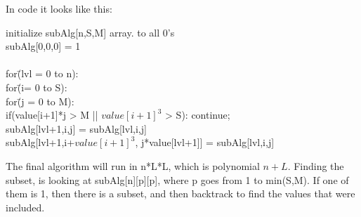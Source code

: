 \documentclass{article}
\begin{document}
\begin{enumerate}
In code it looks like this:
\begin{tabbing}

initialize subAlg[n,S,M] array. to all 0's\\
subAlg[0,0,0] = 1\\
\\
for\=(lvl = 0 to n):\\
\>for\=(i= 0 to S):\\
\>\>for\=(j = 0 to M):\\
\>\>\>if(value[i+1]*j > M || $value[i+1]^3$ > S): continue;\\
\>\>\>subAlg[lvl+1,i,j] = subAlg[lvl,i,j]\\
\>\>\>subAlg[lvl+1,i+$value[i+1]^3$, j*value[lvl+1]] = subAlg[lvl,i,j]\\
\end{tabbing}

The final algorithm will run in n*L*L, which is polynomial $n+L$. Finding the subset, is looking at subAlg[n][p][p], where p goes from 1 to min(S,M). If one of them is 1, then there is a subset, and then backtrack to find the values that were included.
\end{enumerate}
\end{document}
